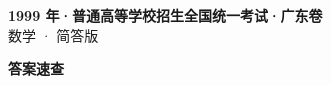 \documentclass[zihao=-4, a4paper]{ctexart}
\begin{document}
\begin{center}
  {\Large\bfseries 1999 年·普通高等学校招生全国统一考试·广东卷}\\[4pt]
  {\large 数学 · 简答版}
\end{center}
\medskip
{}

\clearpage
{}
\begin{center}{\Large\bfseries 答案速查}\end{center}
\medskip

\end{document}
